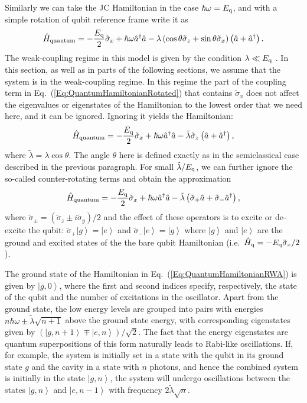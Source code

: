 \documentclass[aps,twocolumn,superscriptaddress]{revtex4}
\newcommand{\ket}[1] {\left| #1 \right\rangle}
\begin{document}
Similarly we can take the JC Hamiltonian in the case $\hbar\omega=E_{\rm q}$, and with a simple rotation of qubit reference frame write it as
%
\begin{equation}
\hat{H}_{\rm quantum} = - \frac{E_{\rm q}}{2} \tilde{\sigma}_x+\hbar\omega \hat{a}^{\dagger}\hat{a} - \lambda \left( \cos\theta\tilde{\sigma}_z+\sin\theta\tilde{\sigma}_x \right) \left( \hat{a} + \hat{a}^{\dagger} \right).
%
\label{Eq:QuantumHamiltonianRotated}
\end{equation}
%
The weak-coupling regime in this model is given by the condition $\lambda\ll E_{\rm q}$ \cite{WeakCouplingFootnote}. In this section, as well as in parts of the following sections, we assume that the system is in the weak-coupling regime. In this regime the part of the coupling term in Eq.~(\ref{Eq:QuantumHamiltonianRotated}) that contains $\tilde{\sigma}_x$ does not affect the eigenvalues or eigenstates of the Hamiltonian to the lowest order that we need here, and it can be ignored. Ignoring it yields the Hamiltonian:
%
\begin{equation}
\hat{H}_{\rm quantum} = -\frac{E_{\rm q}}{2} \tilde{\sigma}_x+\hbar\omega \hat{a}^{\dagger}\hat{a} - \tilde{\lambda} \tilde{\sigma}_z \left( \hat{a} + \hat{a}^{\dagger} \right),
\end{equation}
%
where $\tilde{\lambda}=\lambda\cos\theta$. The angle $\theta$ here is defined exactly as in the semiclassical case described in the previous paragraph. For small $\tilde{\lambda}/E_{\rm q}$, we can further ignore the so-called counter-rotating terms and obtain the approximation
%
\begin{equation}
\hat{H}_{\rm quantum} = -\frac{E_{\rm q}}{2} \tilde{\sigma}_x+\hbar\omega \hat{a}^{\dagger}\hat{a} - \tilde{\lambda} \left( \tilde{\sigma}_+ \hat{a} + \tilde{\sigma}_- \hat{a}^{\dagger} \right),
%
\label{Eq:QuantumHamiltonianRWA}
\end{equation}
%
where $\tilde{\sigma}_{\pm}=\left( \tilde{\sigma}_z \pm i \tilde{\sigma}_y \right)/2$ and the effect of these operators is to excite or de-excite the qubit: $\tilde{\sigma}_+ \ket{g} = \ket{e}$ and $\tilde{\sigma}_- \ket{e} = \ket{g}$ where $\ket{g}$ and $\ket{e}$ are the ground and excited states of the the bare qubit Hamiltonian (i.e.~$\hat{H}_{\rm q}=-E_{\rm q}\tilde{\sigma}_x/2$).

The ground state of the Hamiltonian in Eq.~(\ref{Eq:QuantumHamiltonianRWA}) is given by $\ket{g,0}$, where the first and second indices specify, respectively, the state of the qubit and the number of excitations in the oscillator. Apart from the ground state, the low energy levels are grouped into pairs with energies $n\hbar\omega\pm \tilde{\lambda}\sqrt{n+1}$ above the ground state energy, with corresponding eigenstates given by $\left( \ket{g,n+1}\mp\ket{e,n}\right)/\sqrt{2}$. The fact that the energy eigenstates are quantum superpositions of this form naturally leads to Rabi-like oscillations. If, for example, the system is initially set in a state with the qubit in its ground state $g$ and the cavity in a state with $n$ photons, and hence the combined system is initially in the state $\ket{g,n}$, the system will undergo oscillations between the states $\ket{g,n}$ and $\ket{e,n-1}$ with frequency $2\tilde{\lambda}\sqrt{n}$.
\end{document}
